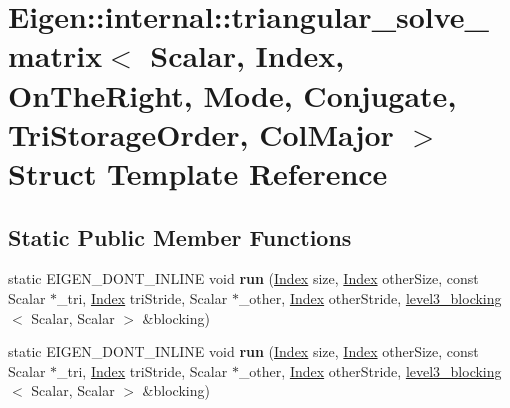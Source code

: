 \hypertarget{struct_eigen_1_1internal_1_1triangular__solve__matrix_3_01_scalar_00_01_index_00_01_on_the_rightf2d31df4e035b9aff2381cc0bac19b97}{}\section{Eigen\+:\+:internal\+:\+:triangular\+\_\+solve\+\_\+matrix$<$ Scalar, Index, On\+The\+Right, Mode, Conjugate, Tri\+Storage\+Order, Col\+Major $>$ Struct Template Reference}
\label{struct_eigen_1_1internal_1_1triangular__solve__matrix_3_01_scalar_00_01_index_00_01_on_the_rightf2d31df4e035b9aff2381cc0bac19b97}
\subsection*{Static Public Member Functions}
\begin{DoxyCompactItemize}
\item 
\mbox{\label{struct_eigen_1_1internal_1_1triangular__solve__matrix_3_01_scalar_00_01_index_00_01_on_the_rightf2d31df4e035b9aff2381cc0bac19b97_a35831180d99cc8f235f3a254934c48bd}} 
static E\+I\+G\+E\+N\+\_\+\+D\+O\+N\+T\+\_\+\+I\+N\+L\+I\+NE void {\bfseries run} (\hyperlink{namespace_eigen_a62e77e0933482dafde8fe197d9a2cfde}{Index} size, \hyperlink{namespace_eigen_a62e77e0933482dafde8fe197d9a2cfde}{Index} other\+Size, const Scalar $\ast$\+\_\+tri, \hyperlink{namespace_eigen_a62e77e0933482dafde8fe197d9a2cfde}{Index} tri\+Stride, Scalar $\ast$\+\_\+other, \hyperlink{namespace_eigen_a62e77e0933482dafde8fe197d9a2cfde}{Index} other\+Stride, \hyperlink{class_eigen_1_1internal_1_1level3__blocking}{level3\+\_\+blocking}$<$ Scalar, Scalar $>$ \&blocking)
\item 
\mbox{\label{struct_eigen_1_1internal_1_1triangular__solve__matrix_3_01_scalar_00_01_index_00_01_on_the_rightf2d31df4e035b9aff2381cc0bac19b97_acd9270d3b57ef626b2fc3dcc2656b248}} 
static E\+I\+G\+E\+N\+\_\+\+D\+O\+N\+T\+\_\+\+I\+N\+L\+I\+NE void {\bfseries run} (\hyperlink{namespace_eigen_a62e77e0933482dafde8fe197d9a2cfde}{Index} size, \hyperlink{namespace_eigen_a62e77e0933482dafde8fe197d9a2cfde}{Index} other\+Size, const Scalar $\ast$\+\_\+tri, \hyperlink{namespace_eigen_a62e77e0933482dafde8fe197d9a2cfde}{Index} tri\+Stride, Scalar $\ast$\+\_\+other, \hyperlink{namespace_eigen_a62e77e0933482dafde8fe197d9a2cfde}{Index} other\+Stride, \hyperlink{class_eigen_1_1internal_1_1level3__blocking}{level3\+\_\+blocking}$<$ Scalar, Scalar $>$ \&blocking)
\end{DoxyCompactItemize}


